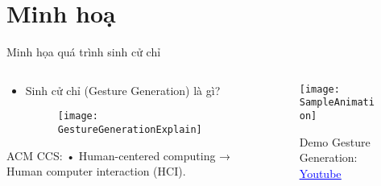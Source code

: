 \section{Minh hoạ}

\begin{frame}{Minh họa quá trình sinh cử chỉ}
	\vspace{10pt}
	\begin{columns}
		\begin{column}{0.7\textwidth}
			\begin{itemize}
				\item Sinh cử chỉ (Gesture Generation) là gì?
				
				\begin{figure}[h]
					\centering
					\texttt{[image: GestureGenerationExplain]}
				\end{figure}
			
			\end{itemize}
			ACM CCS: • Human-centered computing → Human computer interaction (HCI).
			
		\end{column}
		\begin{column}{0.3\textwidth} %
			\begin{figure}[h]
			\centering
			\texttt{[image: SampleAnimation]}
			
				
			{
			\small Demo Gesture Generation: \href{https://www.youtube.com/watch?v=B6nv1kQmi-Q}{\textcolor{blue}{\uline{Youtube}}}
			}
			\end{figure}
		\end{column}
	\end{columns}
\end{frame}

